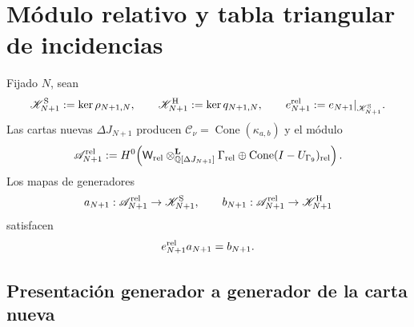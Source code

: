 \section{Módulo relativo y tabla triangular de incidencias}

Fijado $N$, sean
\begin{equation}\label{eq:pdf2-hodge-kernels}
 \mathscr K^{\rm S}_{N+1}:=\ker\rho_{N+1,N},
 \qquad
 \mathscr K^{\rm H}_{N+1}:=\ker q_{N+1,N},
 \qquad
 e_{N+1}^{\rm rel}:=e_{N+1}|_{\mathscr K^{\rm S}_{N+1}}.
\end{equation}
Las cartas nuevas $\Delta J_{N+1}$ producen
$\mathcal C_\nu=\operatorname{Cone}(\kappa_{a,b})$ y el módulo
\begin{equation}\label{eq:pdf2-hodge-a-rel}
 \mathscr A_{N+1}^{\rm rel}:=
 H^0\!\left(
  \mathsf W_{\rm rel}\otimes^{\mathbf L}_{\mathbb Q[\Delta J_{N+1}]}
  \Gamma_{\rm rel}
  \oplus\operatorname{Cone}(I-U_{\Gamma_9})_{\rm rel}
 \right).
\end{equation}
Los mapas de generadores
\begin{equation}\label{eq:pdf2-hodge-mapas-relativos}
 a_{N+1}:\mathscr A_{N+1}^{\rm rel}\to\mathscr K^{\rm S}_{N+1},
 \qquad
 b_{N+1}:\mathscr A_{N+1}^{\rm rel}\to\mathscr K^{\rm H}_{N+1}
\end{equation}
satisfacen
\begin{equation}\label{eq:pdf2-hodge-factorizacion-relativa}
 e_{N+1}^{\rm rel}a_{N+1}=b_{N+1}.
\end{equation}

\subsection{Presentación generador a generador de la carta nueva}

